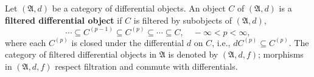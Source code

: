 Let $(\mathfrak{A}, d)$ be a category of differential objects. An object $C$ of $(\mathfrak{A}, d)$ is a \textbf{filtered differential object} if $C$ is filtered by subobjects of $(\mathfrak{A}, d)$,
$$
\cdots \subseteq C^{(p-1)} \subseteq C^{(p)} \subseteq \cdots \subseteq C, \quad -\infty < p < \infty,
$$
where each $C^{(p)}$ is closed under the differential $d$ on $C$, i.e., $d C^{(p)} \subseteq C^{(p)}$. The category of filtered differential objects in $\mathfrak{A}$ is denoted by $(\mathfrak{A}, d, f)$; morphisms in $(\mathfrak{A}, d, f)$ respect filtration and commute with differentials.
